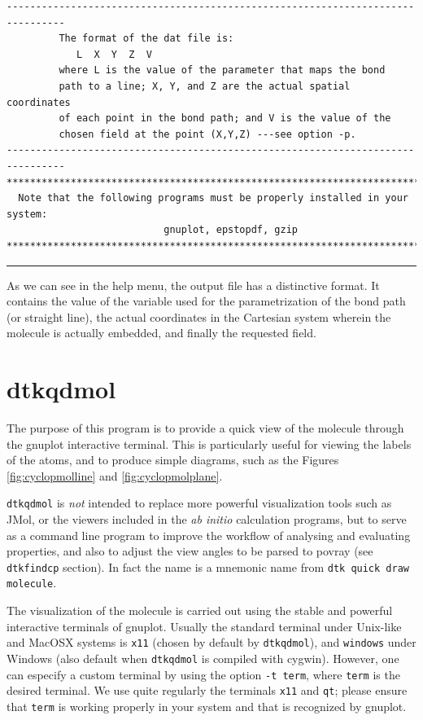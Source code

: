 \begin{footnotesize}
\begin{verbatim}
--------------------------------------------------------------------------------
         The format of the dat file is:
            L  X  Y  Z  V
         where L is the value of the parameter that maps the bond
         path to a line; X, Y, and Z are the actual spatial coordinates
         of each point in the bond path; and V is the value of the
         chosen field at the point (X,Y,Z) ---see option -p.
--------------------------------------------------------------------------------
********************************************************************************
  Note that the following programs must be properly installed in your system:
                           gnuplot, epstopdf, gzip
********************************************************************************
\end{verbatim}
\end{footnotesize}
\rule{\textwidth}{1pt}

As we can see in the help menu, the output file has a distinctive format. It contains the value of the variable used for the parametrization of the bond path (or straight line), the actual coordinates in the Cartesian system wherein the molecule is actually embedded, and finally the requested field.

\section{\label{sec:dtkqdmol}dtkqdmol}

The purpose of this program is to provide a quick view of the molecule through the gnuplot interactive terminal. This is particularly useful for viewing the labels of the atoms, and to produce simple diagrams, such as the Figures \ref{fig:cyclopmolline} and \ref{fig:cyclopmolplane}.

\texttt{dtkqdmol} is \textit{not} intended to replace more powerful visualization tools such as JMol, or the viewers included in the \textit{ab initio} calculation programs, but to serve as a command line program to improve the workflow of analysing and evaluating properties, and also to adjust the view angles to be parsed to povray (see \texttt{dtkfindcp} section). In fact the name is a mnemonic name from \texttt{dtk quick draw molecule}.

The visualization of the molecule is carried out using the stable and powerful interactive terminals of gnuplot. Usually the standard terminal under Unix-like and MacOSX systems is \texttt{x11} (chosen by default by \texttt{dtkqdmol}), and \texttt{windows} under Windows (also default when \texttt{dtkqdmol} is compiled with cygwin). However, one can especify a custom terminal by using the option \texttt{-t term}, where \texttt{term} is the desired terminal. We use quite regularly the terminals \texttt{x11} and \texttt{qt}; please ensure that \texttt{term} is working properly in your system and that is recognized by gnuplot.

